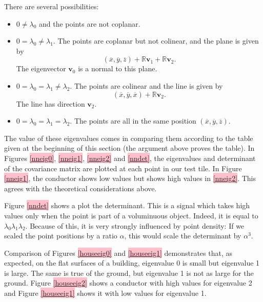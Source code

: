 \documentclass[a4paper,11pt,twoside]{article}
\theoremstyle{definition}
\theoremstyle{remark}
\newcommand{\sh}[1]{\colorbox{pink}{#1}}
\newcommand{\lnk}[1]{\sh{\hyperref[#1]{\ref*{#1}}}}
\begin{document}
There are several possibilities:
\begin{itemize}
\item $0\neq\lambda_0$ and the points are not coplanar.
\item $0=\lambda_0\neq \lambda_1$. The points are coplanar but not colinear, and the plane is given by 
\begin{displaymath}
(\overline x,\overline y,\overline z)+\mathbb{R}\textbf{v}_1+\mathbb{R}\textbf{v}_2.
\end{displaymath}
The eigenvector $\textbf{v}_0$ is a normal to this plane.
\item $0=\lambda_0=\lambda_1\neq\lambda_2$. The points are colinear and the line is given by
\begin{displaymath}
(\overline x,\overline y,\overline x)+\mathbb{R}\textbf{v}_2.
\end{displaymath}
The line has direction $\textbf{v}_2$.
\item $0=\lambda_0=\lambda_1=\lambda_2$. The points are all in the same position $(\overline x,\overline y,\overline z)$.
\end{itemize}
The value of these eigenvalues comes in comparing them according to the table given at the beginning of this section (the argument above proves the table). In Figures \lnk{nneig0}, \lnk{nneig1}, \lnk{nneig2} and \lnk{nndet}, the eigenvalues and determinant of the covariance matrix are plotted at each point in our test tile. In Figure \lnk{nneig1}, the conductor shows low values but shows high values in \lnk{nneig2}. This agrees with the theoretical considerations above. 

Figure \lnk{nndet} shows a plot the determinant. This is a signal which takes high values only when the point is part of a voluminuous object. Indeed, it is equal to $\lambda_0\lambda_1\lambda_2$. Because of this, it is very strongly influenced by point density: If we scaled the point positions by a ratio $\alpha$, this would scale the determinant by $\alpha^3$.

Comparison of Figures \lnk{houseeig0} and \lnk{houseeig1} demonstrates that, as expected, on the flat surfaces of a building, eigenvalue 0 is small but eigenvalue 1 is large. The same is true of the ground, but eigenvalue 1 is not as large for the ground. Figure \lnk{houseeig2} shows a conductor with high values for eigenvalue 2 and Figure \lnk{houseeig1} shows it with low values for eigenvalue 1.
\end{document}
